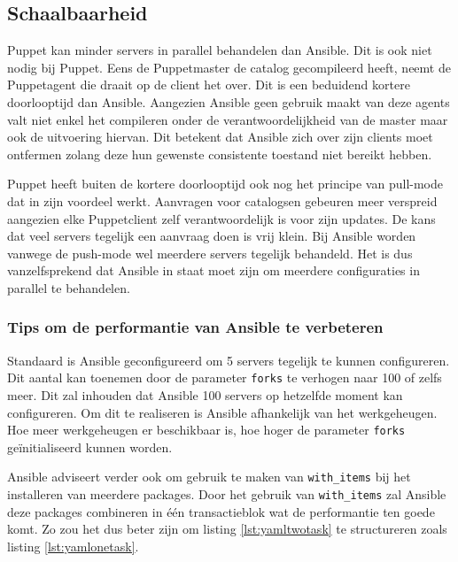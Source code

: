 \subsection{Schaalbaarheid}
\label{sec:schaalbaarheid}

Puppet kan minder servers  in parallel behandelen dan Ansible. Dit is ook niet nodig bij Puppet. Eens de Puppetmaster de \gls{catalog} gecompileerd heeft, neemt de Puppetagent die draait op de client het over. Dit is een beduidend kortere doorlooptijd dan Ansible. Aangezien Ansible geen gebruik maakt van deze agents valt niet enkel het compileren onder de verantwoordelijkheid van de master maar ook de uitvoering hiervan. Dit betekent dat Ansible zich over zijn clients moet ontfermen zolang deze hun gewenste consistente toestand niet bereikt hebben.

Puppet heeft buiten de kortere doorlooptijd ook nog het principe van pull-mode dat in zijn voordeel werkt. Aanvragen voor \gls{catalog}sen gebeuren meer verspreid aangezien elke Puppetclient zelf verantwoordelijk is voor zijn updates. De kans dat veel servers tegelijk een aanvraag doen is vrij klein.  Bij Ansible worden vanwege de push-mode wel meerdere servers tegelijk behandeld. Het is dus vanzelfsprekend dat Ansible in staat moet zijn om meerdere configuraties in parallel te behandelen. 




 \subsubsection{Tips om de performantie van Ansible te verbeteren}
 
 Standaard is Ansible geconfigureerd om 5 servers tegelijk te kunnen configureren. Dit aantal kan toenemen door de parameter \texttt{\gls{fork}s} te verhogen naar 100 of zelfs meer. Dit zal inhouden dat Ansible 100 servers op hetzelfde moment kan configureren. Om dit te realiseren is Ansible afhankelijk van het werkgeheugen. Hoe meer werkgeheugen er beschikbaar is, hoe hoger de parameter \texttt{\gls{fork}s} ge\"initialiseerd kunnen worden.
 
Ansible adviseert verder ook om gebruik te maken van \texttt{with\_items} bij het installeren van meerdere packages. Door het gebruik van \texttt{with\_items} zal Ansible deze packages combineren in \'e\'en transactieblok wat de performantie ten goede komt. Zo zou het dus beter zijn om listing \ref{lst:yamltwotask} te structureren zoals listing \ref{lst:yamlonetask}. 


